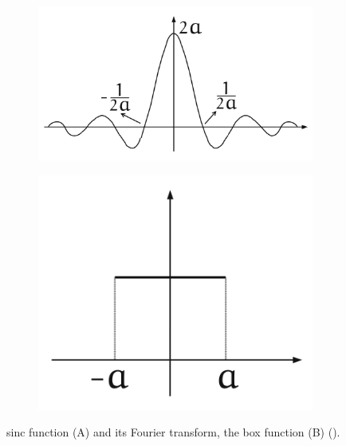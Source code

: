 \begin{figure}[!h]
  \centering
  \begin{subfigure}[b]{0.48\textwidth}
      \centering
      \includegraphics[width=\textwidth]{img/ch2/sinc.png}
      \caption{}
  \end{subfigure}
  \begin{subfigure}[b]{0.32\textwidth}
      \centering
      \includegraphics[width=\textwidth]{img/ch2/box.png}
      \caption{}
  \end{subfigure}
  \caption{sinc function (A) and its Fourier transform, the box function (B) (\cite{ipcgVelho2014}).}
  \label{f:sinc-and-rect}
\end{figure}


